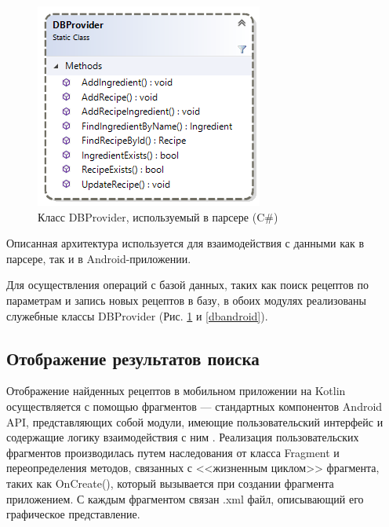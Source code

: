 \documentclass[14pt]{matmex-diploma-custom}
\begin{document}
\begin{figure}[h]
\centering
\includegraphics{dbparser.png}
\caption{Класс DBProvider, используемый в парсере (C\#)}
\label{dbparser}
\end{figure}

Описанная архитектура используется для взаимодействия с данными как в парсере, так и в Android-приложении. 

Для осуществления операций с базой данных, таких как поиск рецептов по параметрам и запись новых рецептов в базу, в обоих модулях реализованы служебные классы DBProvider (Рис. \ref{dbparser} и \ref{dbandroid}). 


\subsection*{Отображение результатов поиска}

Отображение найденных рецептов в мобильном приложении на Kotlin осуществляется с помощью фрагментов --- стандартных компонентов Android API, представляющих собой модули, имеющие пользовательский интерфейс и содержащие логику взаимодействия с ним \cite{fragments}. Реализация пользовательских фрагментов производилась путем наследования от класса Fragment и переопределения методов, связанных с <<жизненным циклом>> фрагмента, таких как OnCreate(), который вызывается при создании фрагмента приложением. С каждым фрагментом связан .xml файл, описывающий его графическое представление.
\end{document}
